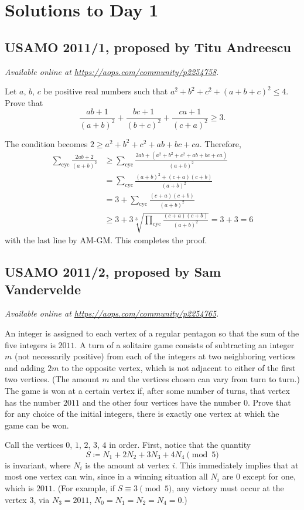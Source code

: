 \documentclass[11pt]{scrartcl}
\begin{document}
\section{Solutions to Day 1}
\subsection{USAMO 2011/1, proposed by Titu Andreescu}
\textsl{Available online at \url{https://aops.com/community/p2254758}.}
\begin{mdframed}[style=mdpurplebox,frametitle={Problem statement}]
Let $a$, $b$, $c$ be positive real numbers
such that $a^2+b^2+c^2+(a+b+c)^2 \le 4$. Prove that
\[ \frac{ab+1}{(a+b)^2}
  + \frac{bc+1}{(b+c)^2}
  + \frac{ca+1}{(c+a)^2} \ge 3. \]
\end{mdframed}
The condition becomes $2 \ge a^2+b^2+c^2 + ab+bc+ca$.
Therefore,
\begin{align*}
  \sum_{\text{cyc}} \frac{2ab+2}{(a+b)^2}
  &\ge \sum_{\text{cyc}} \frac{2ab+(a^2+b^2+c^2+ab+bc+ca)}{(a+b)^2} \\
  &= \sum_{\text{cyc}} \frac{(a+b)^2+(c+a)(c+b)}{(a+b)^2} \\
  &= 3 + \sum_{\text{cyc}} \frac{(c+a)(c+b)}{(a+b)^2} \\
  &\ge 3 + 3\sqrt[3]{\prod_{\text{cyc}} \frac{(c+a)(c+b)}{(a+b)^2}}
  = 3 + 3 = 6
\end{align*}
with the last line by AM-GM.
This completes the proof.
\pagebreak

\subsection{USAMO 2011/2, proposed by Sam Vandervelde}
\textsl{Available online at \url{https://aops.com/community/p2254765}.}
\begin{mdframed}[style=mdpurplebox,frametitle={Problem statement}]
An integer is assigned to each vertex of a regular pentagon
so that the sum of the five integers is $2011$.
A turn of a solitaire game consists of subtracting an integer $m$
(not necessarily positive) from each of the integers at two neighboring vertices
and adding $2m$ to the opposite vertex, which is not adjacent
to either of the first two vertices.
(The amount $m$ and the vertices chosen can vary from turn to turn.)
The game is won at a certain vertex if, after some number of turns,
that vertex has the number $2011$ and the other four vertices have the number $0$.
Prove that for any choice of the initial integers,
there is exactly one vertex at which the game can be won.
\end{mdframed}
Call the vertices $0$, $1$, $2$, $3$, $4$ in order.
First, notice that the quantity
\[ S \coloneqq N_1 + 2N_2 + 3N_3 + 4N_4 \pmod 5 \]
is invariant, where $N_i$ is the amount at vertex $i$.
This immediately implies that at most one vertex can win,
since in a winning situation all $N_i$ are $0$ except for one, which is $2011$.
(For example, if $S \equiv 3 \pmod 5$, any victory must occur at the
vertex $3$, via $N_3 = 2011$, $N_0 = N_1 = N_2 = N_4 = 0$.)
\end{document}
